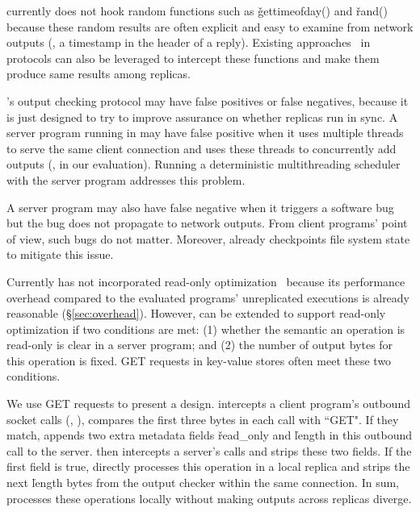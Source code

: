 
\xxx currently does not hook random functions such as \v{gettimeofday()} and 
\v{rand()} because these random results are often explicit and easy to examine 
from network outputs (\eg, a timestamp in the header of a reply). Existing 
approaches~\cite{eve:osdi12,paxos:practical} in \paxos protocols can also be 
leveraged to intercept these functions and make them produce same results among 
replicas.


\xxx's output checking protocol may have false positives or false negatives, 
because it is just designed to try to improve assurance on whether replicas run 
in sync. A server program running in \xxx may have false positive when it uses 
multiple threads to serve the same client connection and uses these threads to 
concurrently add outputs (\eg, \clamav in our evaluation). 
Running a deterministic multithreading 
scheduler~\cite{coredet:asplos10,parrot:sosp13} with the server program 
addresses this problem.

A server program may also have false negative when it triggers a software bug 
but the bug does not propagate to network outputs. From client programs' point 
of view, such bugs do not matter. Moreover, \xxx already checkpoints file 
system state to mitigate this issue.

Currently \xxx has not incorporated read-only optimization~\cite{eve:osdi12} 
because its performance overhead compared to the evaluated programs' 
unreplicated executions is already reasonable (\S\ref{sec:overhead}). However, 
\xxx can be extended to support read-only optimization if two conditions are 
met: (1) whether the semantic an operation is read-only is clear in a server 
program; and (2) the number of output bytes for this operation is fixed. GET 
requests in key-value stores often meet these two conditions.

We use GET requests to present a design. \xxx intercepts a client program's 
outbound socket calls (\eg, \send), compares the first three bytes in each call 
with ``GET". If they match, \xxx appends two extra \xxx metadata fields 
\v{read\_only} and \v{length} in this outbound call to the server. \xxx then 
intercepts a server's \recv calls and strips these two fields. If the first 
field is true, \xxx directly processes this operation in a local replica 
and strips the next \v{length} bytes from the output checker within the same
connection. In sum, \xxx processes these operations locally without making 
outputs across replicas diverge.

